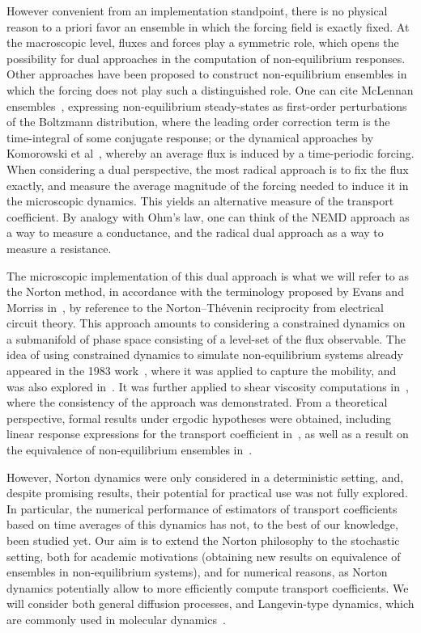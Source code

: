 However convenient from an implementation standpoint, there is no physical reason to a priori favor an ensemble in which the forcing field is exactly fixed. At the macroscopic level, fluxes and forces play a symmetric role, which opens the possibility for dual approaches in the computation of non-equilibrium responses. Other approaches have been proposed to construct non-equilibrium ensembles in which the forcing does not play such a distinguished role. One can cite McLennan ensembles~\cite{MK10}, expressing non-equilibrium steady-states as first-order perturbations of the Boltzmann distribution, where the leading order correction term is the time-integral of some conjugate response; or the dynamical approaches by Komorowski et al~\cite{KLOS22}, whereby an average flux is induced by a time-periodic forcing. When considering a dual perspective, the most radical approach is to fix the flux exactly, and measure the average magnitude of the forcing needed to induce it in the microscopic dynamics. This yields an alternative measure of the transport coefficient. By analogy with Ohm's law, one can think of the NEMD approach as a way to measure a conductance, and the radical dual approach as a way to measure a resistance.

The microscopic implementation of this dual approach is what we will refer to as the Norton method, in accordance with the terminology proposed by Evans and Morriss in~\cite{EM85}, by reference to the Norton--Th\'evenin reciprocity from electrical circuit theory. This approach amounts to considering a constrained dynamics on a submanifold of phase space consisting of a level-set of the flux observable. The idea of using constrained dynamics to simulate non-equilibrium systems already appeared in the 1983 work~\cite{EHFML83}, where it was applied to capture the mobility,
and was also explored in~\cite{HPC93}. It was further applied to shear viscosity computations in~\cite{EE86}, where the consistency of the approach was demonstrated. From a theoretical perspective, formal results under ergodic hypotheses were obtained, including linear response expressions for the transport coefficient in~\cite{EM85}, as well as a result on the equivalence of non-equilibrium ensembles in~\cite{E93}.

However, Norton dynamics were only considered in a deterministic setting, and, despite promising results, their potential for practical use was not fully explored. In particular, the numerical performance of estimators of transport coefficients based on time averages of this dynamics has not, to the best of our knowledge, been studied yet. Our aim is to extend the Norton philosophy to the stochastic setting, both for academic motivations (obtaining new results on equivalence of ensembles in non-equilibrium systems), and for numerical reasons, as Norton dynamics potentially allow to more efficiently compute transport coefficients. We will consider both general diffusion processes, and Langevin-type dynamics, which are commonly used in molecular dynamics~\cite{P14}.

